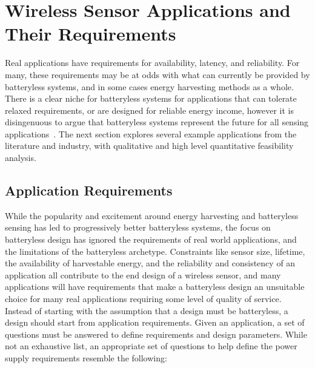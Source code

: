 
\section{Wireless Sensor Applications and Their Requirements}
\label{sec:background:app}
Real applications have requirements for availability, latency, and reliability. For many, these requirements may be at odds with what can currently be provided by batteryless systems, and in some cases energy harvesting methods as a whole.
There is a clear niche for batteryless systems for applications that can tolerate relaxed requirements, or are designed for reliable energy income, however it is disingenuous to argue that batteryless systems represent the future for all sensing applications~\cite{hester2017future}.
The next section explores several example applications from the literature and industry, with qualitative and high level quantitative feasibility analysis.


\subsection{Application Requirements}
\label{sec:background:background_reqs}
While the popularity and excitement around energy harvesting and batteryless sensing has led to progressively better batteryless systems, the focus on batteryless design has ignored the requirements of real world applications, and the limitations of the batteryless archetype.
Constraints like sensor size, lifetime, the availability of harvestable energy, and the reliability and consistency of an application all contribute to the end design of a wireless sensor, and many applications will have requirements that make a batteryless design an unsuitable choice for many real applications requiring some level of quality of service.
Instead of starting with the assumption that a design must be batteryless, a design should start from application requirements. Given an application, a set of questions must be answered to define requirements and design parameters.
While not an exhaustive list, an appropriate set of questions to help define the power supply requirements resemble the following:

